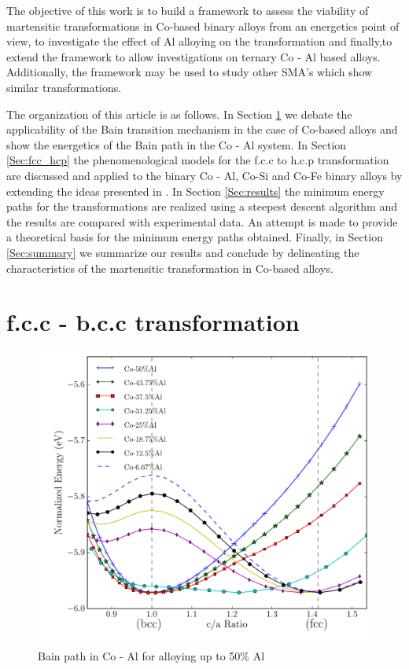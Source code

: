 \documentclass[preprint]{elsarticle}
\begin{document}
The objective of this work is to build a framework to assess the viability of martensitic transformations in Co-based binary alloys from an energetics
 point of view, to investigate the effect of Al alloying on the transformation and finally,to extend the framework to allow investigations
on ternary Co - Al based alloys. Additionally, the framework may be used to study other SMA's which show similar transformations.

The organization of this article is as follows. In Section \ref{Sec:bain} we debate the applicability of the Bain transition mechanism in the case of Co-based alloys and show 
the energetics of the Bain path in the Co - Al system. In Section \ref{Sec:fcc_hcp} the phenomenological models for the f.c.c to h.c.p transformation are discussed and applied to the binary
 Co - Al, Co-Si and Co-Fe binary alloys by extending the ideas presented in \cite{wentzcovitch1991fcc, folkins1990configuration}  . In Section \ref{Sec:results} the minimum energy paths for the transformations are realized using a steepest descent algorithm and the results are
compared with experimental data. An attempt is made to provide a theoretical basis for the minimum energy paths obtained. Finally, in Section \ref{Sec:summary} we 
summarize our results and conclude by delineating the characteristics of the martensitic transformation in Co-based alloys.

\section{f.c.c - b.c.c transformation}
\label{Sec:bain}
\begin{figure}[ht]
  \centering
  \includegraphics[scale = 0.6]{figure_1}
  \caption{Bain path in Co - Al for alloying up to 50\% Al}
  \label{fig:CoAl_bain}
\end{figure}
\end{document}
